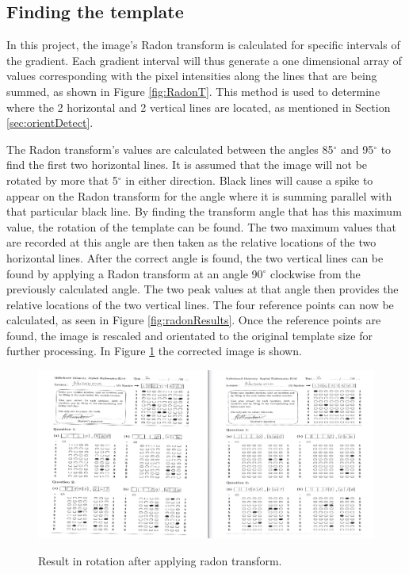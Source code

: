 \subsection{Finding the template}
\label{sec:findTemplate}

In this project, the image's Radon transform is calculated for specific intervals of the gradient. Each gradient interval will thus generate a one dimensional array of values corresponding with the pixel intensities along the lines that are being summed, as shown in Figure \ref{fig:RadonT}. This method is used to determine where the 2 horizontal and 2 vertical lines are located, as mentioned in Section \ref{sec:orientDetect}. 

The Radon transform's values are calculated between the angles 85$^{\circ}$ and 95$^{\circ}$ to find the first two horizontal lines. It is assumed that the image will not be rotated by more that 5$^{\circ}$ in either direction. Black lines will cause a spike to appear on the Radon transform for the angle where it is summing parallel with that particular black line. By finding the transform angle that has this maximum value, the rotation of the template can be found. The two maximum values that are recorded at this angle are then taken as the relative locations of the two horizontal lines. After the correct angle is found, the two vertical lines can be found by applying a Radon transform at an angle 90$^{\circ}$ clockwise from the previously calculated angle. The two peak values at that angle then provides the relative locations of the two vertical lines. The four reference points can now be calculated, as seen in Figure \ref{fig:radonResults}. Once the reference points are found, the image is rescaled and orientated to the original template size for further processing. In Figure \ref{fig:rotate} the corrected image is shown.

\begin{figure}
  \centering
  \includegraphics[width=14cm]{Rotation}\\
  \caption{Result in rotation after applying radon transform.}
  \label{fig:rotate}
\end{figure}

